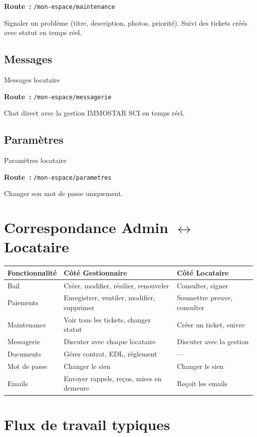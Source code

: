 \documentclass[12pt,a4paper]{article}
\begin{document}
\textbf{Route~:} \texttt{/mon-espace/maintenance}

Signaler un probl\`eme (titre, description, photos, priorit\'e). Suivi des tickets cr\'e\'es avec statut en temps r\'eel.

\subsection{\texorpdfstring{\faComments}{} Messages}{Messages locataire}

\textbf{Route~:} \texttt{/mon-espace/messagerie}

Chat direct avec la gestion IMMOSTAR SCI en temps r\'eel.

\subsection{\texorpdfstring{\faCog}{} Param\`etres}{Param\`etres locataire}

\textbf{Route~:} \texttt{/mon-espace/parametres}

Changer son mot de passe uniquement.

\newpage
\section{Correspondance Admin $\leftrightarrow$ Locataire}

\begin{tabularx}{\textwidth}{lXX}
\toprule
\textbf{Fonctionnalit\'e} & \textbf{C\^ot\'e Gestionnaire} & \textbf{C\^ot\'e Locataire} \\
\midrule
Bail & Cr\'eer, modifier, r\'esilier, renouveler & Consulter, signer \\
Paiements & Enregistrer, ventiler, modifier, supprimer & Soumettre preuve, consulter \\
Maintenance & Voir tous les tickets, changer statut & Cr\'eer un ticket, suivre \\
Messagerie & Discuter avec chaque locataire & Discuter avec la gestion \\
Documents & G\'erer contrat, EDL, r\`eglement & --- \\
Mot de passe & Changer le sien & Changer le sien \\
Emails & Envoyer rappels, re\c{c}us, mises en demeure & Re\c{c}oit les emails \\
\bottomrule
\end{tabularx}

\newpage
\section{Flux de travail typiques}
\end{document}

